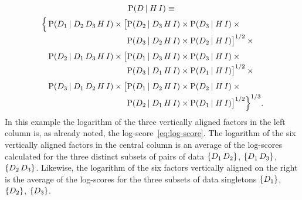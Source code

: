 \documentclass[\ifafour a4paper,12pt,\else a5paper,10pt,\fi%
onecolumn,oneside,article,%
british%
]{memoir}
\theoremstyle{remark}
\theoremstyle{innote}
\DeclarePairedDelimiter\set{\{}{\}}
\newcommand*{\p}{\mathrm{P}}%
\renewcommand*{\|}[1][]{\nonscript\,#1\vert\nonscript\;\mathopen{}}
\newcommand*{\yK}{I}
\begin{document}
\begin{multline}
  \label{eq:example_further_expansion}
  \p(D \| H \, \yK) \equiv{}\\
  \begin{alignedat}[b]{2}
    \Bigl\{\,&\p(D_{1} \| D_{2} \,D_{3} \, H \, \yK) \times
    \bigl[ &&\p(D_{2} \| D_{3} \, H \, \yK) \times \p( D_{3} \| H \, \yK) \times{}\\[-0.5\jot]
    &&&\p(D_{3} \| D_{2} \, H \, \yK) \times \p( D_{2} \| H \, \yK)
    \bigr]^{1/2}\times{}\\[\jot]
    &\p(D_{2} \| D_{1} \,D_{3} \, H \, \yK) \times
    \bigl[&&\p(D_{1} \| D_{3} \, H \, \yK) \times \p( D_{3} \| H \, \yK) \times{}\\[-0.5\jot]
    &&&\p(D_{3} \| D_{1} \, H \, \yK) \times \p( D_{1} \| H \, \yK)
    \bigr]^{1/2}\times{}\\[\jot]
    &\p(D_{3} \| D_{1} \,D_{2} \, H \, \yK) \times
    \bigl[&&\p(D_{1} \| D_{2} \, H \, \yK) \times \p( D_{2} \| H \, \yK) \times{}\\[-0.5\jot]
    &&&\p(D_{2} \| D_{1} \, H \, \yK) \times \p( D_{1} \| H \, \yK)
    \bigr]^{1/2}\Bigr\}^{1/3}.
  \end{alignedat}
\end{multline}
In this example the logarithm of the three vertically aligned factors in
the left column is, as already noted, the log-score~\eqref{eq:log-score}.
The logarithm of the six vertically aligned factors in the central column
is an average of the log-scores calculated for the three distinct subsets
of pairs of data $\set{D_{1}\,D_{2}}$, $\set{D_{1}\, D_{3}}$,
$\set{D_{2}\, D_{3}}$. Likewise, the logarithm of the six factors
vertically aligned on the right is the average of the log-scores for the
three subsets of data singletons $\set{D_{1}}$, $\set{D_{2}}$,
$\set{D_{3}}$.
\end{document}

